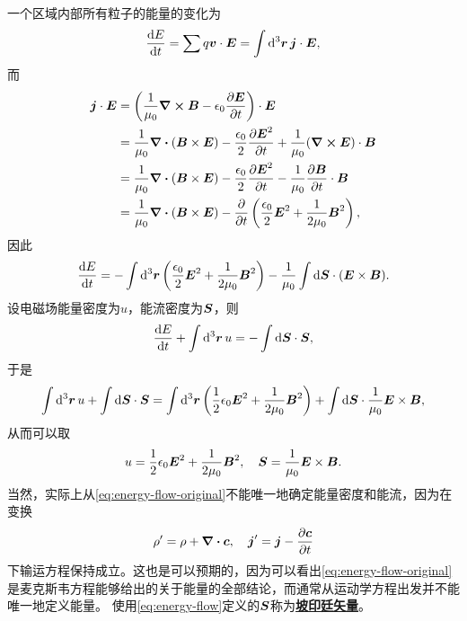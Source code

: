 \documentclass[UTF8, a4paper]{ctexart}
\newcommand*{\concept}[1]{\underline{\textbf{#1}}}
\begin{document}
一个区域内部所有粒子的能量的变化为
\begin{equation}
    \dv{E}{t} = \sum q \vb*{v} \cdot \vb*{E} = \int \dd[3]{\vb*{r}} \vb*{j} \cdot \vb*{E},
\end{equation}
而
\[
    \begin{aligned}
        \vb*{j} \cdot \vb*{E} &= \left( \frac{1}{\mu_0} \curl{\vb*{B}} - \epsilon_0 \pdv{\vb*{E}}{t} \right) \cdot \vb*{E} \\
        &= \frac{1}{\mu_0} \div{(\vb*{B} \times \vb*{E})} - \frac{\epsilon_0}{2} \pdv{\vb*{E}^2}{t} + \frac{1}{\mu_0} (\curl{\vb*{E}}) \cdot \vb*{B} \\
        &= \frac{1}{\mu_0} \div{(\vb*{B} \times \vb*{E})} - \frac{\epsilon_0}{2} \pdv{\vb*{E}^2}{t} - \frac{1}{\mu_0} \pdv{\vb*{B}}{t} \cdot \vb*{B} \\
        &= \frac{1}{\mu_0} \div{(\vb*{B} \times \vb*{E})} - \pdv{t} \left( \frac{\epsilon_0}{2} \vb*{E}^2 + \frac{1}{2 \mu_0} \vb*{B}^2 \right),
    \end{aligned}
\]
因此
\[
    \dv{E}{t} = - \int \dd[3]{\vb*{r}} \left( \frac{\epsilon_0}{2} \vb*{E}^2 + \frac{1}{2 \mu_0} \vb*{B}^2 \right) - \frac{1}{\mu_0} \int \dd{\vb*{S}} \cdot (\vb*{E} \times \vb*{B}).
\]
设电磁场能量密度为$u$，能流密度为$\vb*{S}$，则
\[
    \dv{E}{t} + \int \dd[3]{\vb*{r}} u = - \int \dd{\vb*{S}} \cdot \vb*{S},
\]
于是
\begin{equation}
    \int \dd[3]{\vb*{r}} u + \int \dd{\vb*{S}} \cdot \vb*{S} = \int \dd[3]{\vb*{r}} \left( \frac{1}{2} \epsilon_0 \vb*{E}^2 + \frac{1}{2\mu_0} \vb*{B}^2 \right) + \int \dd{\vb*{S}} \cdot \frac{1}{\mu_0} \vb*{E} \times \vb*{B},
    \label{eq:energy-flow-original}
\end{equation}
从而可以取
\begin{equation}
    u = \frac{1}{2} \epsilon_0 \vb*{E}^2 + \frac{1}{2\mu_0} \vb*{B}^2, \quad \vb*{S} = \frac{1}{\mu_0} \vb*{E} \times \vb*{B}.
    \label{eq:energy-flow}
\end{equation}
当然，实际上从\eqref{eq:energy-flow-original}不能唯一地确定能量密度和能流，因为在变换
\[
    \rho' = \rho + \div{\vb*{c}}, \quad \vb*{j}' = \vb*{j} - \pdv{\vb*{c}}{t}
\]
下输运方程保持成立。这也是可以预期的，因为可以看出\eqref{eq:energy-flow-original}是麦克斯韦方程能够给出的关于能量的全部结论，而通常从运动学方程出发并不能唯一地定义能量。
使用\eqref{eq:energy-flow}定义的$\vb*{S}$称为\concept{坡印廷矢量}。
\end{document}
